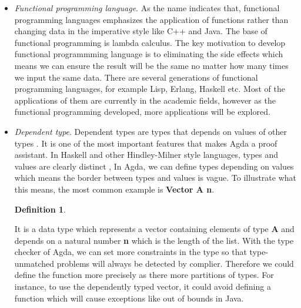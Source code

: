 \documentclass{article}
\newcommand{\Conid}[1]{\mathit{#1}}
\newcommand{\Varid}[1]{\mathit{#1}}
\def\resethooks{%
  \global\let\SaveRestoreHook\empty
  \global\let\ColumnHook\empty}
\newcommand{\hsindent}[1]{\quad}%
\let\hspre\empty
\let\hspost\empty
\renewcommand\Varid[1]{\mathord{\textsf{#1}}}
\let\Conid\Varid
\newcommand\Keyword[1]{\textsf{\textbf{#1}}}
\theoremstyle{definition}
\newtheorem{definition}{Definition}[section]
\begin{document}
\begin{itemize}
\item \textit{Functional programming language}. As the name indicates that, functional programming languages emphasizes the application of functions rather than changing data in the imperative style like C++ and Java. The base of functional programming is lambda calculus. The key motivation to develop functional programmming language is to eliminating the side effects which means we can ensure the result will be the same no matter how many times we input the same data. There are several generations of functional programming languages, for example Lisp, Erlang, Haskell etc. Most of the applications of them are currently in the academic fields, however as the functional programming developed, more applications will be explored.

\item \textit{Dependent type}. Dependent types are types that depends on values of other types \cite{dtw}. It is one of the most important features that makes Agda a proof assistant. In Haskell and other Hindley-Milner style languages, types and values are clearly distinct \cite{tutorial}, In Agda, we can define types depending on values which means the border between types and values is vague. To illustrate what this means, the most common example is \textbf{Vector A n}.

\begin{definition}
\resethooks
\end{definition}

 It is a data type which represents a vector containing elements of type \textbf{A} and depends on a natural number \textbf{n} which is the length of the list. With the type checker of Agda, we can set more constraints in the type so that type-unmatched problems will always be detected by complier. Therefore we could define the function more precisely as there more partitions of types. For instance, to use the dependently typed vector, it could avoid defining a function which will cause exceptions like out of bounds in Java.


\end{itemize}
\end{document}
